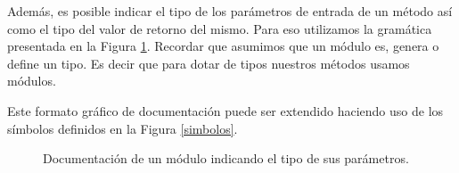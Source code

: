 Además, es posible indicar el tipo de los parámetros de entrada de un método así como el tipo del valor de retorno del mismo. Para eso utilizamos la gramática presentada en la Figura \ref{parametros}. Recordar que asumimos que un módulo es, genera o define un tipo. Es decir que para dotar de tipos nuestros métodos usamos módulos.

Este formato gráfico de documentación puede ser extendido haciendo uso de los símbolos definidos en la Figura \ref{simbolos}. 

\begin{figure}[H]
\begin{center}
\caption{Documentación de un módulo indicando el tipo de sus parámetros.}
\label{parametros}
\end{center}
\end{figure}

 

